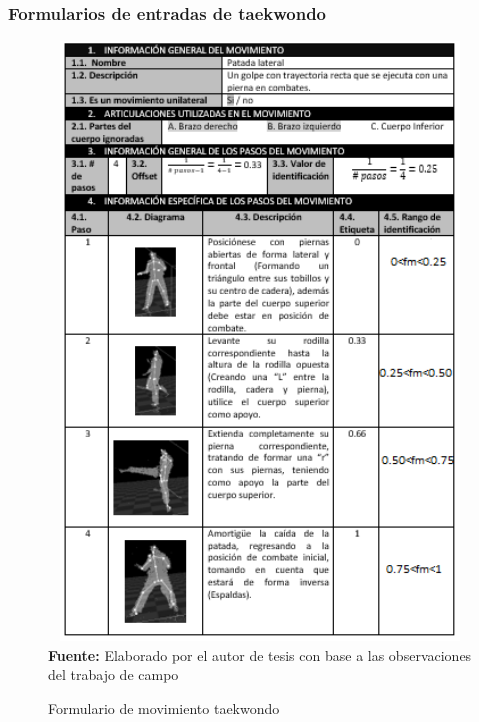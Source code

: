 \subsubsection{Formularios de entradas de taekwondo}
\begin{figure}[H]
	\caption{Formulario de movimiento taekwondo}
	\label{fig:frmWhiteMov}
	\centering	\includegraphics[width=445px,height=600px]{graphics/resultados/movimientoTaekwondo.PNG} \\
	\textbf{Fuente:} Elaborado por el autor de tesis con base a las observaciones del trabajo de campo
\end{figure}
